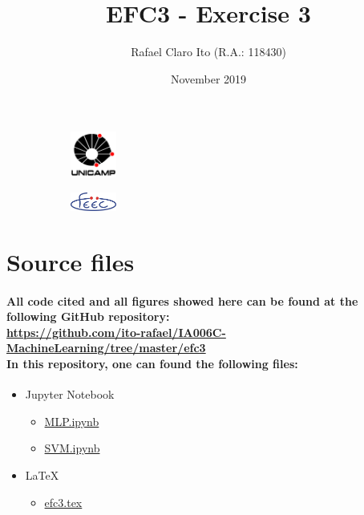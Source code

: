 \documentclass[a4paper]{article}    %
\begin{document}
\begin{figure}
    \centering
    \begin{subfigure}{0.45\textwidth}
        \centering
        \includegraphics[width=1.5cm]{unicamp}
    \end{subfigure}
    \hfill
    \begin{subfigure}{0.45\textwidth}
        \centering
        \includegraphics[width=1.5cm]{feec}
    \end{subfigure}
\end{figure}

\title{EFC3 - Exercise 3}
\author{Rafael Claro Ito (R.A.: 118430)}
\date{November 2019}
\maketitle
\newpage

\section{Source files}

\paragraph{All code cited and all figures showed here can be found at the following GitHub repository:\\
\url{https://github.com/ito-rafael/IA006C-MachineLearning/tree/master/efc3}\\
In this repository, one can found the following files:\\}

\begin{itemize}
    \item Jupyter Notebook
    \begin{itemize}
        \item \href{https://github.com/ito-rafael/IA006C-MachineLearning/tree/master/efc3/notebooks}{MLP.ipynb}
        \item \href{https://github.com/ito-rafael/IA006C-MachineLearning/blob/master/efc3/notebooks/SVM.ipynb}{SVM.ipynb}
    \end{itemize}
    \item \LaTeX
    \begin{itemize}
        \item \href{https://github.com/ito-rafael/IA006C-MachineLearning/blob/master/efc3/latex/efc3.tex}{efc3.tex}
    \end{itemize}
\end{itemize}
\end{document}
